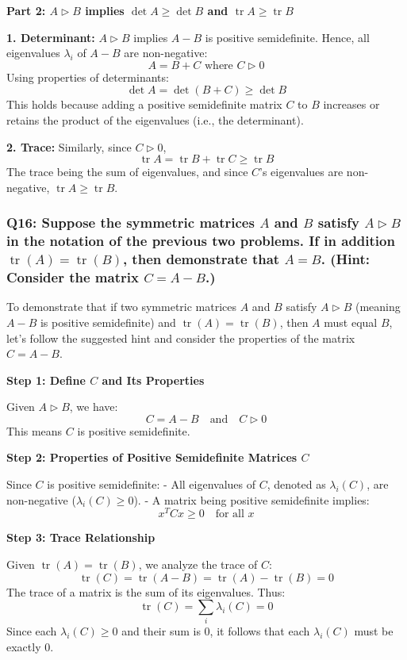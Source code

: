 \documentclass[8pt]{article}
\begin{document}
{{\textbf{Part 2: \(A \triangleright B\) implies \(\det A \geq \det B\) and \(\operatorname{tr} A \geq \operatorname{tr} B\)}

\textbf{1. Determinant:}
   \(A \triangleright B\) implies \(A - B\) is positive semidefinite. Hence, all eigenvalues \(\lambda_i\) of \(A - B\) are non-negative:
   \[
   A = B + C \text{ where } C \triangleright 0
   \]
   Using properties of determinants:
   \[
   \det A = \det (B + C) \geq \det B
   \]
   This holds because adding a positive semidefinite matrix \(C\) to \(B\) increases or retains the product of the eigenvalues (i.e., the determinant).

\textbf{2. Trace:}
   Similarly, since \(C \triangleright 0\),
   \[
   \operatorname{tr} A = \operatorname{tr} B + \operatorname{tr} C \geq \operatorname{tr} B
   \]
   The trace being the sum of eigenvalues, and since \(C\)'s eigenvalues are non-negative, \(\operatorname{tr} A \geq \operatorname{tr} B\).


\subsubsection*{Q16: Suppose the symmetric matrices \(A\) and \(B\) satisfy \(A \triangleright B\) in the notation of the previous two problems. If in addition \(\operatorname{tr} (A) = \operatorname{tr} (B)\), then demonstrate that \(A = B\). (Hint: Consider the matrix \(C = A - B\).)}

To demonstrate that if two symmetric matrices \(A\) and \(B\) satisfy \(A \triangleright B\) (meaning \(A - B\) is positive semidefinite) and \(\operatorname{tr}(A) = \operatorname{tr}(B)\), then \(A\) must equal \(B\), let's follow the suggested hint and consider the properties of the matrix \(C = A - B\).

\textbf{Step 1: Define \(C\) and Its Properties}

Given \(A \triangleright B\), we have:
\[
C = A - B \quad \text{and} \quad C \triangleright 0
\]
This means \(C\) is positive semidefinite.

\textbf{Step 2: Properties of Positive Semidefinite Matrices \(C\)}

Since \(C\) is positive semidefinite:
- All eigenvalues of \(C\), denoted as \(\lambda_i(C)\), are non-negative (\(\lambda_i(C) \geq 0\)).
- A matrix being positive semidefinite implies:
  \[
  x^T C x \geq 0 \quad \text{for all } x
  \]

\textbf{Step 3: Trace Relationship}

Given \(\operatorname{tr}(A) = \operatorname{tr}(B)\), we analyze the trace of \(C\):
\[
\operatorname{tr}(C) = \operatorname{tr}(A - B) = \operatorname{tr}(A) - \operatorname{tr}(B) = 0
\]
The trace of a matrix is the sum of its eigenvalues. Thus:
\[
\operatorname{tr}(C) = \sum_i \lambda_i(C) = 0
\]
Since each \(\lambda_i(C) \geq 0\) and their sum is 0, it follows that each \(\lambda_i(C)\) must be exactly 0.

}}
\end{document}

